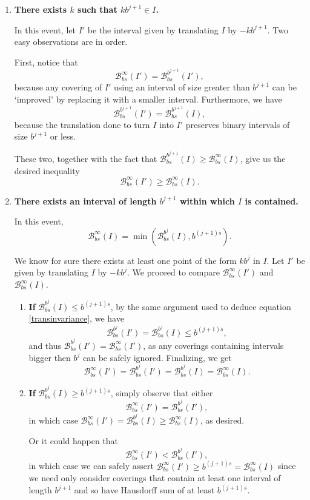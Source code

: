 \documentclass[11pt, reqno]{amsart}
\newcommand{\BB}{\mathcal{B}}
\begin{document}
\begin{enumerate}[label=\textbf{Case \arabic*:}]

\item \textbf{There exists $k$ such that $k b^{j+1} \in I$.}

In this event, let $I'$ be the interval given by translating $I$ by $-k b^{j+1}$. Two easy observations are in order.

First, notice that
\[\BB_{bs}^\infty(I') = \BB_{bs}^{b^{j+1}}(I'),\]
because any covering of $I'$ using an interval of size greater than $b^{j+1}$ can be `improved' by replacing it with a smaller interval. Furthermore, we have
\begin{equation}\label{transinvariance}
\BB_{bs}^{b^{j+1}}(I') = \BB_{bs}^{b^{j+1}}(I),
\end{equation}
because the translation done to turn $I$ into $I'$ preserves binary intervals of size $b^{j+1}$ or less.

These two, together with the fact that $\BB_{bs}^{b^{j+1}}(I) \geq \BB_{bs}^\infty(I)$, give us the desired inequality
\[\BB_{bs}^\infty(I') \geq \BB_{bs}^\infty(I).\]

\item \textbf{There exists an interval of length $b^{j+1}$ within which $I$ is contained.}

In this event, 
\[\BB_{bs}^\infty(I) = \min(\BB_{bs}^{b^j}(I), b^{(j+1)s}).\]

We know for sure there exists at least one point of the form $k b^j$ in $I$. Let $I'$ be given by translating $I$ by $-k b^j$. We proceed to compare $\BB_{bs}^\infty(I')$ and $\BB_{bs}^\infty(I)$.

\begin{enumerate}[label=\textbf{Subcase \alph*:}]

\item \textbf{If} $\BB_{bs}^{b^j}(I) \leq b^{(j+1)s}$, by the same argument used to deduce equation \eqref{transinvariance}, we have
\[\BB_{bs}^{b^j}(I') = \BB_{bs}^{b^j}(I) \leq b^{(j+1)s},\]
and thus $\BB_{bs}^{b^j}(I') = \BB_{bs}^\infty(I')$, as any coverings containing intervals bigger then $b^j$ can be safely ignored. Finalizing, we get
\[\BB_{bs}^\infty(I') = \BB_{bs}^{b^j}(I') = \BB_{bs}^{b^j}(I) = \BB_{bs}^\infty(I).\]

\item \textbf{If} $\BB_{bs}^{b^j}(I) \geq b^{(j+1)s}$, simply observe that either
\[\BB_{bs}^\infty(I') = \BB_{bs}^{b^j}(I'),\]
in which case $\BB_{bs}^\infty(I') = \BB_{bs}^{b^j}(I) \geq \BB_{bs}^\infty(I)$, as desired.

Or it could happen that
\[\BB_{bs}^\infty(I') < \BB_{bs}^{b^j}(I'),\]
in which case we can safely assert $\BB_{bs}^\infty(I') \geq b^{(j+1)s} = \BB_{bs}^\infty(I)$ since we need only consider coverings that contain at least one interval of length $b^{j+1}$ and so have Hausdorff sum of at least $b^{(j+1)s}$.
\end{enumerate}
\end{enumerate}
\end{document}
